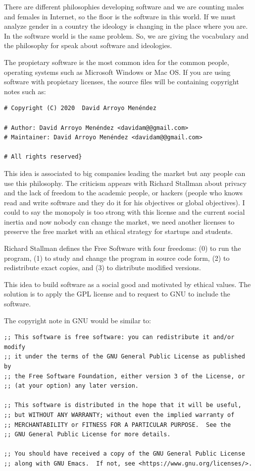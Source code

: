 \documentclass[fleqn,10pt,lineno]{wlpeerj} %
\begin{document}
There are different philosophies developing software and we are
counting males and females in Internet, so the floor is the software
in this world. If we must analyze gender in a country the ideology is
changing in the place where you are. In the software world is the same
problem. So, we are giving the vocabulary and the philosophy for speak
about software and ideologies.

The propietary software is the most common idea for the common people,
operating systems such as Microsoft Windows or Mac OS. If you are
using software with propietary licenses, the source files will be
containing copyright notes such as:

\begin{verbatim}
# Copyright (C) 2020  David Arroyo Menéndez

# Author: David Arroyo Menéndez <davidam@@gmail.com>
# Maintainer: David Arroyo Menéndez <davidam@@gmail.com>

# All rights reserved}
\end{verbatim}

This idea is associated to big companies leading the market but any
people can use this philosophy. The criticism appears with Richard
Stallman about privacy and the lack of freedom to the academic people,
or hackers (people who knows read and write software and they do it
for his objectives or global objectives). I could to say the monopoly
is too strong with this license and the current social inertia and now
nobody can change the market, we need another licenses to preserve the
free market with an ethical strategy for startups and students.

Richard Stallman defines the Free Software with four freedoms: (0) to
run the program, (1) to study and change the program in source code
form, (2) to redistribute exact copies, and (3) to distribute modified
versions. ~\cite{stallman2002free}

This idea to build software as a social good and motivated by ethical
values. The solution is to apply the GPL license and to request to GNU
to include the software.

The copyright note in GNU would be similar to:

\begin{verbatim}
;; This software is free software: you can redistribute it and/or modify
;; it under the terms of the GNU General Public License as published by
;; the Free Software Foundation, either version 3 of the License, or
;; (at your option) any later version.

;; This software is distributed in the hope that it will be useful,
;; but WITHOUT ANY WARRANTY; without even the implied warranty of
;; MERCHANTABILITY or FITNESS FOR A PARTICULAR PURPOSE.  See the
;; GNU General Public License for more details.

;; You should have received a copy of the GNU General Public License
;; along with GNU Emacs.  If not, see <https://www.gnu.org/licenses/>.
\end{verbatim}
\end{document}
